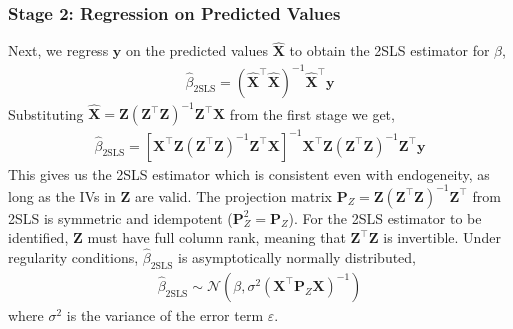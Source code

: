 \subsubsection{Stage 2: Regression on Predicted Values}
Next, we regress \(\mathbf{y}\) on the predicted values \(\hat{\mathbf{X}}\) to obtain the 2SLS estimator for \(\beta\),
\begin{align}
\hat{\beta}_{\text{2SLS}} = (\hat{\mathbf{X}}^\top \hat{\mathbf{X}})^{-1} \hat{\mathbf{X}}^\top \mathbf{y}
\end{align}
Substituting \(\hat{\mathbf{X}} = \mathbf{Z}(\mathbf{Z}^\top \mathbf{Z})^{-1}\mathbf{Z}^\top \mathbf{X}\) from the first stage we get,
\begin{align}
\hat{\beta}_{\text{2SLS}} = \left[\mathbf{X}^\top \mathbf{Z}(\mathbf{Z}^\top \mathbf{Z})^{-1} \mathbf{Z}^\top \mathbf{X}\right]^{-1} \mathbf{X}^\top \mathbf{Z}(\mathbf{Z}^\top \mathbf{Z})^{-1} \mathbf{Z}^\top \mathbf{y}
\end{align}
This gives us the 2SLS estimator which is consistent even with endogeneity, as long as the IVs in \(\mathbf{Z}\) are valid. The projection matrix \(\mathbf{P}_Z = \mathbf{Z}(\mathbf{Z}^\top \mathbf{Z})^{-1}\mathbf{Z}^\top\) from 2SLS is symmetric and idempotent (\(\mathbf{P}_Z^2 = \mathbf{P}_Z\)). For the 2SLS estimator to be identified, \(\mathbf{Z}\) must have full column rank, meaning that \(\mathbf{Z}^\top \mathbf{Z}\) is invertible. Under regularity conditions, \(\hat{\beta}_{\text{2SLS}}\) is asymptotically normally distributed,
\begin{align}
\hat{\beta}_{\text{2SLS}} \sim \mathcal{N}\left(\beta, \sigma^2 (\mathbf{X}^\top \mathbf{P}_Z \mathbf{X})^{-1}\right)
\end{align}
where \(\sigma^2\) is the variance of the error term \(\varepsilon\).
